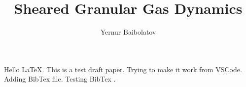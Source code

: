 \documentclass[preprint, aps, pra]{revtex4-1}
\begin{document}
  \title{Sheared Granular Gas Dynamics}
  \author{Yernur Baibolatov}
  \maketitle
  Hello \LaTeX. This is a test draft paper. Trying to make it work from VSCode. Adding BibTex file. Testing BibTex
  \cite{Brilliantov:2004book, Bodrova:2014epl_steep_distr, Brilliantov:2007pre_coll_dyn, 
  Brilliantov:2007pre_coll_adh, Schwager:2007gm_coll_dyn, Dilley:1993icarus_energy_loss, 
  Garzo:2012pre_maxwell_gas, DeSoria:2013pre_hydro_gas, Schaefer:1996jphys_force_schemes, 
  Garzo:2007pre_enskog_I, Garzo:2007pre_enskog_II, Garzo:1999pre_gran_mixture, 
  Geminard:2004pre_gran_pressure, Quinn:2010astro_hill_simplectic, Barrat:2002gm_binary_mix, 
  Hoffmann:2013astrolett_vertical_relax, Cuendet:2007jchem_md_simul, Uecker:2009pre_part_energy, 
  Morishima:2006icarus_dense_ring_simul, Ohtsuki:1998icarus_vel_disp, Salo:2010icarus_N_body, 
  Greenberg:1988icarus, Spahn:2006gamm_hydro_rings, Lois:2007pre_shear_flow, 
  Spahn:2004euro_lett_kinetic_fraggr, Spahn:2000icarus_stability_analysis, WisdomTremaine:1988astro}.


  
  
\end{document}
